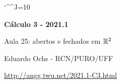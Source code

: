 \documentclass[oneside,12pt]{article}
\begin{document}
\catcode`\^^J=10

\pu

%
%

\def\BA{\mathsf{B}}
\def\BF{\overline{\mathsf{B}}}

\def\drafturl{http://angg.twu.net/LATEX/2021-1-C3.pdf}
\def\drafturl{http://angg.twu.net/2021.1-C3.html}
\def\draftfooter{\tiny \href{\drafturl}{\jobname{}} \ColorBrown{\shorttoday{} \hours}}



%

\thispagestyle{empty}

\begin{center}

\vspace*{1.2cm}

{\bf \Large Cálculo 3 - 2021.1}

\bsk

Aula 25: abertos e fechados em $\mathbb{R}^2$

\bsk

Eduardo Ochs - RCN/PURO/UFF

\url{http://angg.twu.net/2021.1-C3.html}

\end{center}
\end{document}
